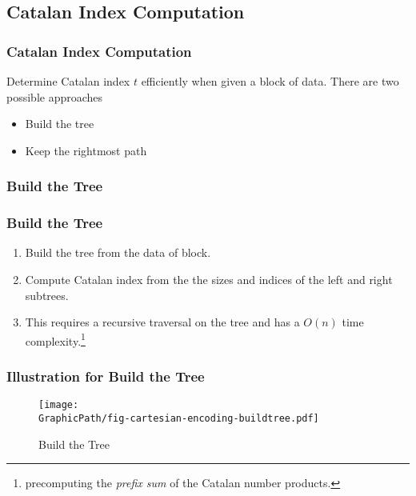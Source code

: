 \subsection{Catalan Index Computation}

\begin{frame}
	\frametitle{Catalan Index Computation}
	Determine Catalan index $t$ efficiently when given a block of data.
	There are two possible approaches

	\begin{itemize}
		\setlength\itemsep{1em}
		\item Build the tree
		\item Keep the rightmost path
	\end{itemize}
\end{frame}

\subsubsection{Build the Tree}
\begin{frame}
    \frametitle{Build the Tree}
    \begin{enumerate}
    	\setlength\itemsep{1em}
    	\item 
    		Build the tree from the data of block.
    	\item
    		Compute Catalan index from the the sizes and indices of the
			left and right subtrees.  
		\item 
			This requires a recursive traversal on the tree and has a
			$O(n)$ time complexity.\footnote{precomputing the {\em
			prefix sum} of the Catalan number products.}
	\end{enumerate}

    \begin{center}
		\scalebox{1} { \begin{minipage}{\textwidth}
			
			\end{minipage}
		}
	\end{center}
\end{frame}

\begin{withoutheadline}
\begin{frame}
	\frametitle{Illustration for Build the Tree}
	\begin{figure}[htbp]   
	  \centering
	  \texttt{[image: \\GraphicPath/fig-cartesian-encoding-buildtree.pdf]}
	  \caption{Build the Tree}
	\end{figure}
\end{frame}
\end{withoutheadline}

